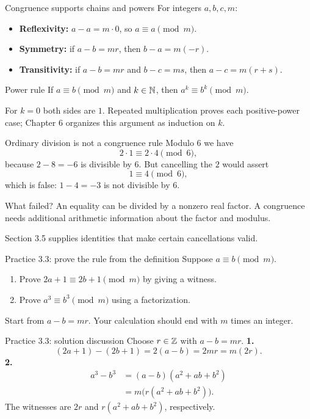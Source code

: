 \begin{frame}{Congruence supports chains and powers}
For integers $a,b,c,m$:
\begin{itemize}
\item \textbf{Reflexivity:} $a-a=m\cdot0$, so $a\equiv a\pmod m$.
\item \textbf{Symmetry:} if $a-b=mr$, then $b-a=m(-r)$.
\item \textbf{Transitivity:} if $a-b=mr$ and $b-c=ms$, then $a-c=m(r+s)$.
\end{itemize}
\begin{block}{Power rule}
If $a\equiv b\pmod m$ and $k\in\mathbb{N}$, then $a^k\equiv b^k\pmod m$.
\end{block}
For $k=0$ both sides are $1$. Repeated multiplication proves each positive-power case;
Chapter 6 organizes this argument as induction on $k$.
\end{frame}

\begin{frame}{Ordinary division is not a congruence rule}
Modulo $6$ we have
\[
2\cdot1\equiv2\cdot4\pmod6,
\]
because $2-8=-6$ is divisible by $6$.
But cancelling the $2$ would assert
\[
1\equiv4\pmod6,
\]
which is false: $1-4=-3$ is not divisible by $6$.
\begin{block}{What failed?}
An equality can be divided by a nonzero real factor.
A congruence needs additional arithmetic information about the factor and modulus.
\end{block}
Section 3.5 supplies identities that make certain cancellations valid.
\end{frame}

\begin{frame}{Practice 3.3: prove the rule from the definition}
Suppose $a\equiv b\pmod m$.
\begin{enumerate}
\item Prove $2a+1\equiv2b+1\pmod m$ by giving a witness.
\item Prove $a^3\equiv b^3\pmod m$ using a factorization.
\end{enumerate}
\vspace{1em}
Start from $a-b=mr$.
Your calculation should end with $m$ times an integer.
\end{frame}

\begin{frame}{Practice 3.3: solution discussion}
Choose $r\in\mathbb{Z}$ with $a-b=mr$.
\textbf{1.}
\[
(2a+1)-(2b+1)=2(a-b)=2mr=m(2r).
\]
\textbf{2.}
\[
\begin{aligned}
a^3-b^3&=(a-b)(a^2+ab+b^2)\\
       &=m\bigl(r(a^2+ab+b^2)\bigr).
\end{aligned}
\]
The witnesses are $2r$ and $r(a^2+ab+b^2)$, respectively.
\end{frame}

